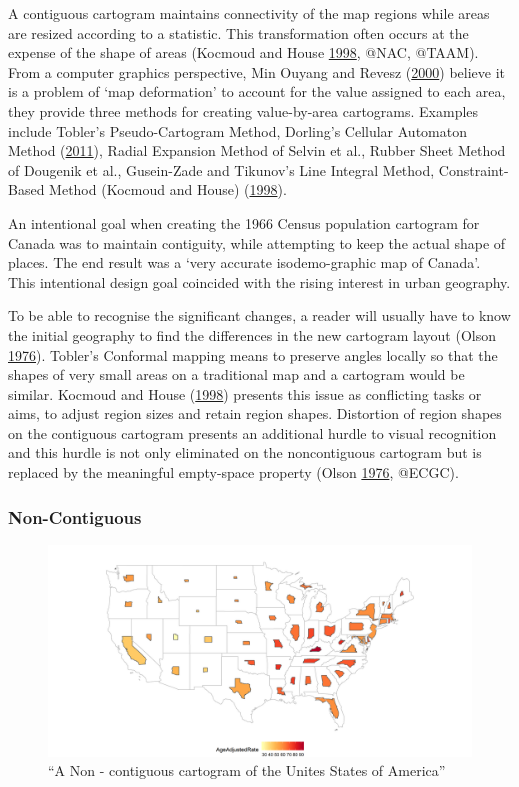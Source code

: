 \documentclass[11pt,]{article}
\begin{document}
A contiguous cartogram maintains connectivity of the map regions while
areas are resized according to a statistic. This transformation often
occurs at the expense of the shape of areas (Kocmoud and House
\protect\hyperlink{ref-CBATCC}{1998}, @NAC, @TAAM). From a computer
graphics perspective, Min Ouyang and Revesz
(\protect\hyperlink{ref-ACA}{2000}) believe it is a problem of `map
deformation' to account for the value assigned to each area, they
provide three methods for creating value-by-area cartograms. Examples
include Tobler's Pseudo-Cartogram Method, Dorling's Cellular Automaton
Method (\protect\hyperlink{ref-ACTUC}{2011}), Radial Expansion Method of
Selvin et al., Rubber Sheet Method of Dougenik et al., Gusein-Zade and
Tikunov's Line Integral Method, Constraint-Based Method (Kocmoud and
House) (\protect\hyperlink{ref-CBATCC}{1998}).

An intentional goal when creating the 1966 Census population cartogram
for Canada was to maintain contiguity, while attempting to keep the
actual shape of places. The end result was a `very accurate
isodemo-graphic map of Canada'. This intentional design goal coincided
with the rising interest in urban geography.

To be able to recognise the significant changes, a reader will usually
have to know the initial geography to find the differences in the new
cartogram layout (Olson \protect\hyperlink{ref-NAC}{1976}). Tobler's
Conformal mapping means to preserve angles locally so that the shapes of
very small areas on a traditional map and a cartogram would be similar.
Kocmoud and House (\protect\hyperlink{ref-CBATCC}{1998}) presents this
issue as conflicting tasks or aims, to adjust region sizes and retain
region shapes. Distortion of region shapes on the contiguous cartogram
presents an additional hurdle to visual recognition and this hurdle is
not only eliminated on the noncontiguous cartogram but is replaced by
the meaningful empty-space property (Olson
\protect\hyperlink{ref-NAC}{1976}, @ECGC).

\hypertarget{non-contiguous}{%
\subsubsection{Non-Contiguous}\label{non-contiguous}}

\begin{figure}
\centering
\includegraphics{figures/ggncont.png}
\caption{``A Non - contiguous cartogram of the Unites States of
America''}
\end{figure}
\end{document}
